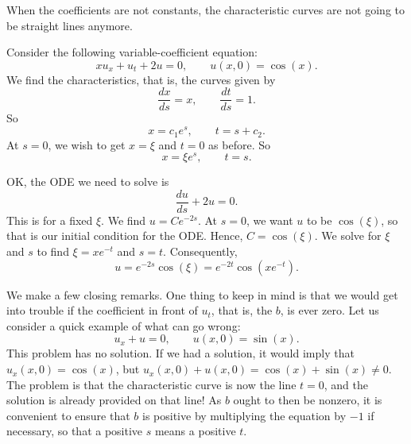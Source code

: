 When the coefficients are not constants, the characteristic curves
are not going to be straight lines anymore.

\begin{example}
Consider the following variable-coefficient equation:
\begin{equation*}
x u_x + u_t + 2 u = 0, \qquad u(x,0) = \cos(x) . %
\end{equation*}
We find the characteristics, that is, the curves given by
\begin{equation*}
\frac{dx}{ds} = x, \qquad \frac{dt}{ds} = 1 .
\end{equation*}
So
\begin{equation*}
x = c_1 e^{s} , \qquad t = s+ c_2 .
\end{equation*}
At $s=0$, we wish to get $x=\xi$ and $t=0$ as before.  So
\begin{equation*}
x = \xi e^s, \qquad t = s .
\end{equation*}

OK\@, the ODE we need to solve is
\begin{equation*}
\frac{du}{ds} + 2 u = 0 .
\end{equation*}
This is for a fixed $\xi$.  We find $u = C e^{-2s}$.
At $s=0$, we want $u$ to be
$\cos(\xi)$, so that is our initial condition for the ODE\@.
Hence, $C = \cos(\xi)$.
We solve for $\xi$ and $s$ to find
$\xi = xe^{-t}$ and $s=t$.
Consequently,
\begin{equation*}
u = e^{-2s} \cos(\xi)= e^{-2t} \cos(xe^{-t}) .
\end{equation*}
\end{example}


We make a few closing remarks.
One thing to keep in mind is that we would get into trouble if the
coefficient in front of $u_t$, that is, the $b$, is ever zero.
Let us consider a quick example of what can go wrong:
\begin{equation*}
u_x + u = 0, \qquad u(x,0) = \sin(x).
\end{equation*}
This problem has no solution.  If we had a solution, it
would imply that $u_x(x,0) = \cos(x)$,
but $u_x(x,0) + u(x,0) = \cos(x) + \sin(x) \not= 0$.
The problem is that the characteristic curve is now the line $t=0$,
and the solution is already provided on that line!
As $b$ ought to then be nonzero,
it is convenient to ensure that $b$ is positive by multiplying
the equation by $-1$
if necessary, so that a positive $s$ means a positive $t$.

